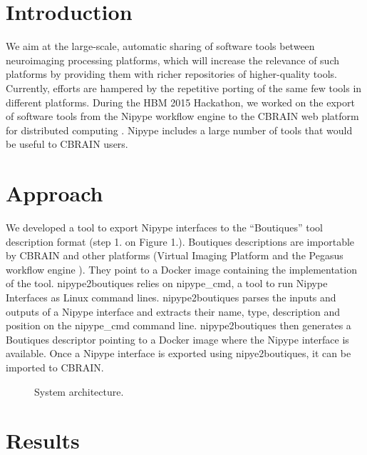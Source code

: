 \documentclass[twocolumn]{bmcart}%
\begin{document}

\section{Introduction}\label{introduction}

We aim at the large-scale, automatic sharing of software tools between
neuroimaging processing platforms, which will increase the relevance of
such platforms by providing them with richer repositories of
higher-quality tools. Currently, efforts are hampered by the repetitive
porting of the same few tools in different platforms. During the HBM
2015 Hackathon, we worked on the export of software tools from the
Nipype workflow engine \cite{Gorgolewski2011} to the CBRAIN web platform
for distributed computing \cite{sherif2014cbrain}. Nipype includes a
large number of tools that would be useful to CBRAIN users.

\section{Approach}\label{approach}

We developed a tool to export Nipype interfaces to the ``Boutiques''
tool description format (step 1. on Figure 1.). Boutiques descriptions
are importable by CBRAIN and other platforms (Virtual Imaging Platform
\cite{GLAT-13} and the Pegasus workflow engine \cite{DEEL-16}). They
point to a Docker image containing the implementation of the tool.
nipype2boutiques relies on nipype\_cmd, a tool to run Nipype Interfaces
as Linux command lines. nipype2boutiques parses the inputs and outputs
of a Nipype interface and extracts their name, type, description and
position on the nipype\_cmd command line. nipype2boutiques then
generates a Boutiques descriptor pointing to a Docker image where the
Nipype interface is available. Once a Nipype interface is exported using
nipye2boutiques, it can be imported to CBRAIN.

\begin{figure}[h!]
  \def\svgwidth{\columnwidth}
  
  \caption{\label{centfig} System architecture.} 
\end{figure}

\section{Results}\label{results}
\end{document}
